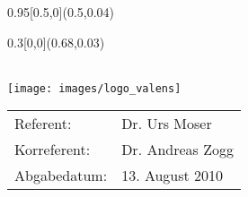 
\begin{titlepage}
	\setlength{\TPHorizModule}{\paperwidth}
	\setlength{\TPVertModule}{\paperheight}
	\begin{textblock}{0.95}[0.5,0](0.5,0.04)
	\end{textblock}
	\begin{textblock}{0.3}[0,0](0.68,0.03)
	\end{textblock}
    \vspace*{6cm}
    \begin{center}
    	\Huge{\color{HeadBlue}{Basisstation zu elektrophysiologischem Mini-Datenlogger\\}}
		\vspace*{2cm}
		\normalsize
      	{}\\
		\vspace*{2cm}      	
		\texttt{[image: images/logo\_valens]}


    \vspace*{1.5cm}
    \color{HeadBlue}
    \begin{tabular}{p{4cm}l}
      Referent: & Dr. Urs Moser \\
      Korreferent: & Dr. Andreas Zogg \\
      Abgabedatum: & 13. August 2010
    \end{tabular}\\
    \end{center}
  \end{titlepage}



